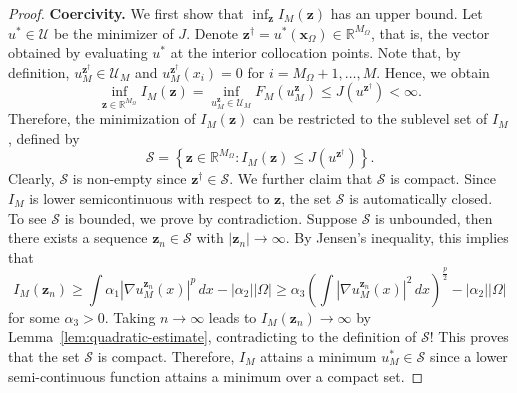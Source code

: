 \documentclass[10pt,a4paper]{amsart}
\begin{document}
\begin{proof}
  
  

 


{\bf Coercivity.}
We first show that $\inf_{\boldsymbol{z}} I_M(\boldsymbol{z})$ has an upper bound.
Let $u^* \in \mathcal{U}$ be the minimizer of $J$.
Denote $\boldsymbol{z}^{\dagger} = u^*(\boldsymbol{x}_{\Omega}) \in \mathbb{R}^{M_{\Omega}}$, that is, the vector obtained by evaluating $u^*$ at the interior collocation points. 
Note that, by definition, $u_M^{\boldsymbol{z}^{\dagger}} \in \mathcal{U}_M$ and $u_M^{\boldsymbol{z}^{\dagger}}(x_i)=0$ for $i = M_{\Omega} + 1, \ldots, M$.
Hence, we obtain 
\[
\inf_{\boldsymbol{z} \in \mathbb{R}^{M_{\Omega}}}I_M(\boldsymbol{z}) = \inf_{u_M^{\boldsymbol{z}} \in \mathcal{U}_M} F_M(u_M^{\boldsymbol{z}}) \leq J(u^{\boldsymbol{z}^{\dagger}}) < \infty.
\]
Therefore, the minimization of $I_M(\boldsymbol{z})$ can be restricted to the sublevel set of $I_M$, defined by 
\[
\mathcal{S} = \left\{\boldsymbol{z} \in \mathbb{R}^{M_{\Omega}}:  I_M(\boldsymbol{z}) \leq J\left(u^{\boldsymbol{z}^{\dagger}}\right)\right\}.
\]
Clearly, $\mathcal{S}$ is non-empty since $\boldsymbol{z} ^{\dagger}\in \mathcal{S}$.
We further claim that $\mathcal{S}$ is compact. 
Since $I_M$ is lower semicontinuous with respect to $\boldsymbol{z}$, the set $\mathcal{S}$ is automatically closed. 
To see $\mathcal{S}$ is bounded, we prove by contradiction. Suppose $\mathcal{S}$ is unbounded, then there exists a sequence $\boldsymbol{z}_n \in \mathcal{S}$ with
$|\boldsymbol{z}_n| \to \infty$. By Jensen's inequality, this implies that
\[
I_M(\boldsymbol{z}_n) \geq \int \alpha_1 \left|\nabla u_M^{\boldsymbol{z}_n}(x)\right|^p \, dx - |\alpha_2| |\Omega| 
\geq \alpha_3 \left(\int \left|\nabla u_M^{\boldsymbol{z}_n}(x)\right|^2 \, dx\right)^{\frac{p}{2}} - |\alpha_2| |\Omega| 
\]
for some $\alpha_3>0$. 
Taking $n \to \infty$ leads to $I_M(\boldsymbol{z}_n) \to \infty$ by Lemma~\ref{lem:quadratic-estimate}, contradicting to the definition of $\mathcal{S}$!
This proves that the set  $\mathcal{S}$ is compact.
Therefore, $I_M$ attains a minimum $u_M^* \in \mathcal{S}$ since a lower semi-continuous function attains a minimum over a compact set.  
\end{proof}
\end{document}
